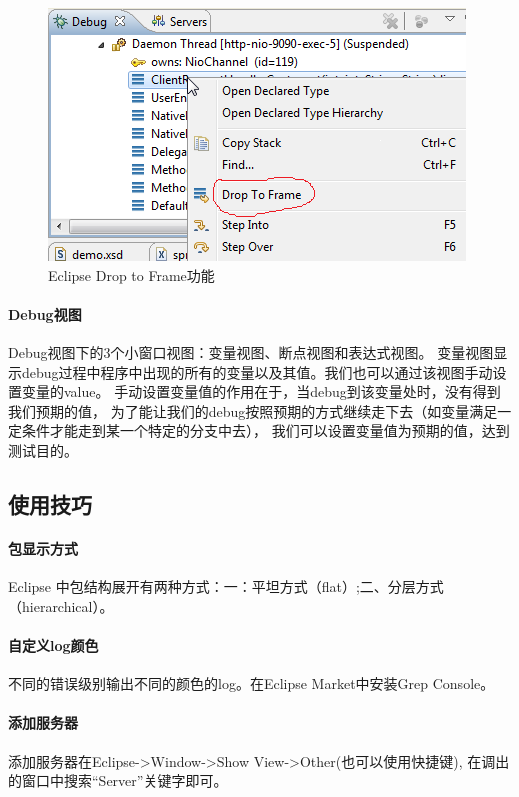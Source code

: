 \documentclass{book}
\begin{document}
\begin{figure}[htbp]
	\centering
	\includegraphics[scale=0.6]{EclipseDropToFrame.png}
	\caption{Eclipse Drop to Frame功能}
	\label{code:EclipseDropToFrame}
\end{figure}



\paragraph{Debug视图}

Debug视图下的3个小窗口视图：变量视图、断点视图和表达式视图。
变量视图显示debug过程中程序中出现的所有的变量以及其值。我们也可以通过该视图手动设置变量的value。
手动设置变量值的作用在于，当debug到该变量处时，没有得到我们预期的值，
为了能让我们的debug按照预期的方式继续走下去（如变量满足一定条件才能走到某一个特定的分支中去），
我们可以设置变量值为预期的值，达到测试目的。

\subsection{使用技巧}

\paragraph{包显示方式}
Eclipse 中包结构展开有两种方式：一：平坦方式（flat）;二、分层方式（hierarchical）。

\paragraph{自定义log颜色}
不同的错误级别输出不同的颜色的log。在Eclipse Market中安装Grep Console。

\paragraph{添加服务器}
添加服务器在Eclipse->Window->Show View->Other(也可以使用快捷键),
在调出的窗口中搜索“Server”关键字即可。
\end{document}

